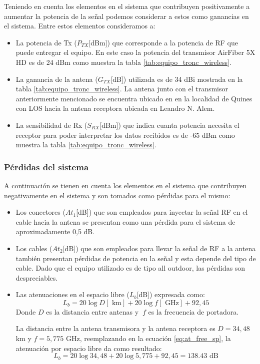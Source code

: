 \documentclass[11pt,a4paper]{article}
\begin{document}
Teniendo en cuenta los elementos en el sistema que contribuyen positivamente a aumentar la potencia de la señal podemos considerar a estos como ganancias en el sistema. Entre estos elementos consideramos a:

\begin{itemize}
  \item  La potencia de Tx ($P_{TX}$[dBm]) que corresponde a la potencia de RF que puede entregar el equipo. En este caso la potencia del transmisor AirFiber 5X HD es de 24 dBm como muestra la tabla \ref{tab:equipo_tronc_wireless}. 

  \item  La ganancia de la antena  ($G_{TX}$[dB])  utilizada es de 34 dBi mostrada en la tabla \ref{tab:equipo_tronc_wireless}.  
  La antena junto con el transmisor anteriormente mencionado se encuentra ubicado en en la localidad de Quines con LOS hacia la antena receptora ubicada en Leandro N. Alem. 

  \item  La sensibilidad de Rx ($S_{RX}$[dBm]) que indica cuanta potencia necesita el receptor para poder interpretar los datos recibidos es de -65 dBm como muestra la tabla \ref{tab:equipo_tronc_wireless}.
\end{itemize}

\subsubsection{Pérdidas del sistema}

A continuación se tienen en cuenta los elementos en el sistema que contribuyen negativamente en el sistema y son tomados como pérdidas para el mismo: 

\begin{itemize}
  \item  Los conectores (${At}_1$[dB]) que son empleados para inyectar la señal RF en el cable hacia la antena se presentan como una pérdida para el sistema de aproximadamente 0,5 dB.

  \item  Los cables (${At}_2$[dB]) que son empleados para llevar la señal de RF a la antena también presentan pérdidas de potencia en la señal y esta depende del tipo de cable. Dado que el equipo utilizado es de tipo all outdoor, las pérdidas son despreciables.

  \item  Las atenuaciones en el espacio libre ($L_b$[dB]) expresada como:
  \begin{equation}
    L_b=20\log{D} [\text{ km}]+20\log{f} [\text{ GHz}]+92,45
    \label{eq:at_free_sp}
  \end{equation}
  Donde $D$ es la distancia entre antenas y $\ f$ es la frecuencia de portadora. 

  La distancia entre la antena transmisora y la antena receptora es $D=34,48$ km y $f=5,775$ GHz, reemplazando en la ecuación \ref{eq:at_free_sp}, la atenuación por espacio libre da como resultado:
  \begin{equation*}
    L_b=20\log{34,48}+20\log{5,775}+92,45=138.43 \text{ dB} 
  \end{equation*}
  

\end{itemize}
\end{document}
